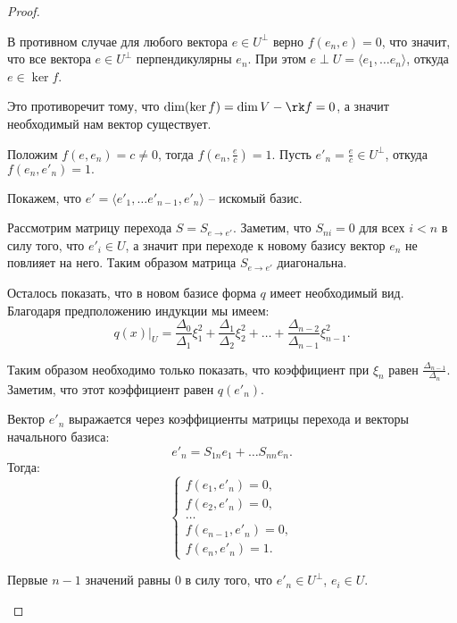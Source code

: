 \begin{proof}
\begin{enumerate}
        В противном случае для любого вектора $e \in U^{\perp}$ верно $f(e_n, e) = 0$, что значит, 
        что все вектора $e \in U^{\perp}$ перпендикулярны $e_n$. При этом $e \perp U = \langle e_1, \dots e_n\rangle$, 
        откуда $e \in \ker f$. 
        
        Это противоречит тому, что $\dim (\ker f) = \dim V - \rk f = 0$, а значит необходимый нам вектор существует.
        
        Положим $f(e, e_n) = c \neq 0$, 
        тогда $f(e_n, \frac{e}{c}) = 1$. Пусть $e'_n = \frac{e}{c} \in U^{\perp}$, откуда $f(e_n, e'_n)  = 1.$

        Покажем, что $e' = \langle e'_1, \dots e'_{n-1}, e'_n\rangle$ -- искомый базис. 

        Рассмотрим матрицу перехода $S = S_{e \to e'}$. Заметим, что $S_{ni} = 0$ для всех $i < n$ 
        в силу того, что $e'_i \in U$, а значит при переходе к новому базису вектор $e_n$ не повлияет 
        на него. Таким образом матрица $S_{e \to e'}$ диагональна.

        Осталось показать, что в новом базисе форма $q$ имеет необходимый вид. Благодаря предположению 
        индукции мы имеем:
        $$q(x)\vert_U = \frac{\Delta_0}{\Delta_1} \xi_1^2 + \frac{\Delta_1}{\Delta_2} \xi_2^2 + \dots + 
        \frac{\Delta_{n-2}}{\Delta_{n-1}} \xi_{n-1}^2.$$ 

        Таким образом необходимо только показать, что коэффициент при $\xi_n$ равен 
        $\frac{\Delta_{n-1}}{\Delta_n}$. Заметим, что этот коэффициент равен $q(e'_n)$.

        Вектор $e'_n$ выражается через коэффициенты матрицы перехода и векторы начального базиса: 
        $$e'_n = S_{1n}e_1 + \dots S_{nn}e_n.$$ Тогда:
        \begin{equation*}
            \begin{cases}
                f(e_1, e'_n) = 0,         \\
                f(e_2, e'_n) = 0,         \\
                \dots                     \\
                f(e_{n-1}, e'_n) = 0,     \\
                f(e_n, e'_n) = 1.
            \end{cases}
        \end{equation*}

        Первые $n-1$ значений равны $0$ в силу того, что $e'_n \in U^{\perp}$, $e_i \in U$.


\end{enumerate}
\end{proof}
